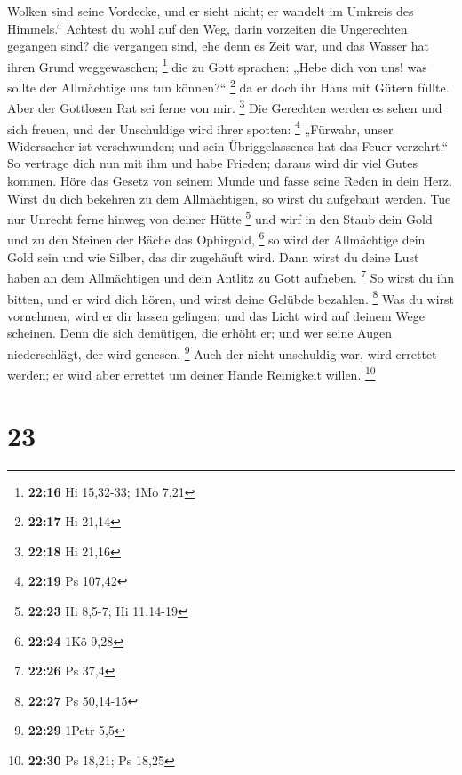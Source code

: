 Wolken sind seine Vordecke, und er sieht nicht; er wandelt im Umkreis
des Himmels.``  Achtest du wohl auf den Weg, darin
vorzeiten die Ungerechten gegangen sind?  die vergangen
sind, ehe denn es Zeit war, und das Wasser hat ihren Grund weggewaschen;
\footnote{\textbf{22:16} Hi 15,32-33; 1Mo 7,21}  die zu
Gott sprachen: „Hebe dich von uns! was sollte der Allmächtige uns tun
können?{}`` \footnote{\textbf{22:17} Hi 21,14}  da er doch
ihr Haus mit Gütern füllte. Aber der Gottlosen Rat sei ferne von mir.
\footnote{\textbf{22:18} Hi 21,16}  Die Gerechten werden es
sehen und sich freuen, und der Unschuldige wird ihrer spotten:
\footnote{\textbf{22:19} Ps 107,42}  „Fürwahr, unser
Widersacher ist verschwunden; und sein Übriggelassenes hat das Feuer
verzehrt.``  So vertrage dich nun mit ihm und habe Frieden;
daraus wird dir viel Gutes kommen.  Höre das Gesetz von
seinem Munde und fasse seine Reden in dein Herz.  Wirst du
dich bekehren zu dem Allmächtigen, so wirst du aufgebaut werden. Tue nur
Unrecht ferne hinweg von deiner Hütte \footnote{\textbf{22:23} Hi 8,5-7;
  Hi 11,14-19}  und wirf in den Staub dein Gold und zu den
Steinen der Bäche das Ophirgold, \footnote{\textbf{22:24} 1Kö 9,28}
 so wird der Allmächtige dein Gold sein und wie Silber, das
dir zugehäuft wird.  Dann wirst du deine Lust haben an dem
Allmächtigen und dein Antlitz zu Gott aufheben. \footnote{\textbf{22:26}
  Ps 37,4}  So wirst du ihn bitten, und er wird dich hören,
und wirst deine Gelübde bezahlen. \footnote{\textbf{22:27} Ps 50,14-15}
 Was du wirst vornehmen, wird er dir lassen gelingen; und
das Licht wird auf deinem Wege scheinen.  Denn die sich
demütigen, die erhöht er; und wer seine Augen niederschlägt, der wird
genesen. \footnote{\textbf{22:29} 1Petr 5,5}  Auch der
nicht unschuldig war, wird errettet werden; er wird aber errettet um
deiner Hände Reinigkeit willen. \footnote{\textbf{22:30} Ps 18,21; Ps
  18,25}

\hypertarget{section-5}{%
\section{23}\label{section-5}}

